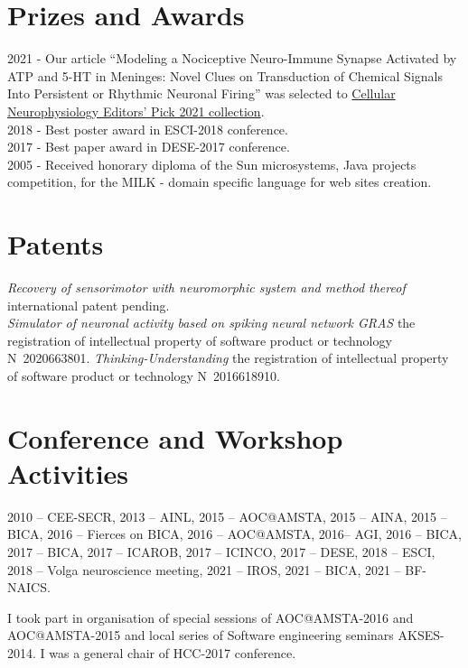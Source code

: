 \documentclass{moderncv}
\begin{document}
    \section{Prizes and Awards}
    2021 - Our article ``Modeling a Nociceptive Neuro-Immune Synapse Activated by ATP and 5-HT in Meninges: Novel Clues on Transduction of Chemical Signals Into Persistent or Rhythmic Neuronal Firing'' was selected to \href{https://www.frontiersin.org/research-topics/21434/cellular-neurophysiology-editors-pick-2021}{Cellular Neurophysiology Editors' Pick 2021 collection}.\\
    2018 - Best poster award in ESCI-2018 conference.\\
    2017 - Best paper award in DESE-2017 conference.\\
    2005 - Received honorary diploma of the Sun microsystems, Java projects competition, for the MILK - domain specific language for web sites creation.

    \section{Patents}
    \emph{Recovery of sensorimotor with neuromorphic system and method thereof} international patent pending.\\
    \emph{Simulator of neuronal activity based on spiking neural network GRAS} the registration of intellectual property of software product or technology N~2020663801.
    \emph{Thinking-Understanding} the registration of intellectual property of software product or technology N~2016618910.\\
    
    
    \section{Conference and Workshop Activities}
    2010 -- CEE-SECR, 2013 -- AINL, 2015 -- AOC@AMSTA, 2015 -- AINA, 2015 -- BICA, 2016 -- Fierces on BICA, 2016 -- AOC@AMSTA, 2016-- AGI, 2016 -- BICA, 2017 -- BICA, 2017 -- ICAROB, 2017 -- ICINCO, 2017 -- DESE, 2018 -- ESCI, 2018 -- Volga neuroscience meeting, 2021 -- IROS, 2021 -- BICA, 2021 -- BF-NAICS.

    I took part in organisation of special sessions of AOC@AMSTA-2016 and AOC@AMSTA-2015 and local series of Software engineering seminars AKSES-2014. I was a general chair of HCC-2017 conference.
\end{document}
